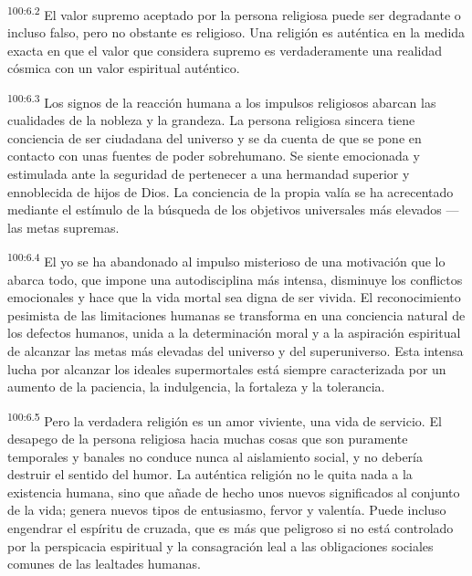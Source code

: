 \documentclass[twoside, 11pt]{book}
\begin{document}
\par
\textsuperscript{100:6.2} El valor supremo aceptado por la persona religiosa puede ser degradante o incluso falso, pero no obstante es religioso. Una religión es auténtica en la medida exacta en que el valor que considera supremo es verdaderamente una realidad cósmica con un valor espiritual auténtico.

\par
\textsuperscript{100:6.3} Los signos de la reacción humana a los impulsos religiosos abarcan las cualidades de la nobleza y la grandeza. La persona religiosa sincera tiene conciencia de ser ciudadana del universo y se da cuenta de que se pone en contacto con unas fuentes de poder sobrehumano. Se siente emocionada y estimulada ante la seguridad de pertenecer a una hermandad superior y ennoblecida de hijos de Dios. La conciencia de la propia valía se ha acrecentado mediante el estímulo de la búsqueda de los objetivos universales más elevados ---las metas supremas.

\par
\textsuperscript{100:6.4} El yo se ha abandonado al impulso misterioso de una motivación que lo abarca todo, que impone una autodisciplina más intensa, disminuye los conflictos emocionales y hace que la vida mortal sea digna de ser vivida. El reconocimiento pesimista de las limitaciones humanas se transforma en una conciencia natural de los defectos humanos, unida a la determinación moral y a la aspiración espiritual de alcanzar las metas más elevadas del universo y del superuniverso. Esta intensa lucha por alcanzar los ideales supermortales está siempre caracterizada por un aumento de la paciencia, la indulgencia, la fortaleza y la tolerancia.

\par
\textsuperscript{100:6.5} Pero la verdadera religión es un amor viviente, una vida de servicio. El desapego de la persona religiosa hacia muchas cosas que son puramente temporales y banales no conduce nunca al aislamiento social, y no debería destruir el sentido del humor. La auténtica religión no le quita nada a la existencia humana, sino que añade de hecho unos nuevos significados al conjunto de la vida; genera nuevos tipos de entusiasmo, fervor y valentía. Puede incluso engendrar el espíritu de cruzada, que es más que peligroso si no está controlado por la perspicacia espiritual y la consagración leal a las obligaciones sociales comunes de las lealtades humanas.
\end{document}
